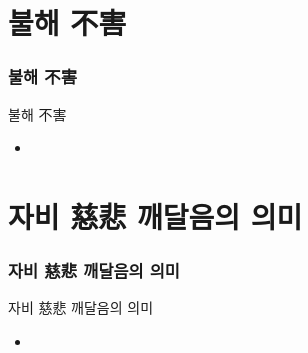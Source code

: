 \documentclass[aspectratio=1610,17pt,xcolor=pdftex,dvipsnames,table,handout]{beamer}
\begin{document}
		\section{				불해	不害	}
		\begin{frame} [t,plain]						
		\frametitle{			불해	不害	}
			\begin{block} { 		불해	不害	}
			\setlength{\leftmargini}{2em}			
			\begin{itemize}
				\item 
			\end{itemize}
			\end{block}						
								
		\end{frame}						

		\section{				자비 慈悲 깨달음의 의미		}
		\begin{frame} [t,plain]						
		\frametitle{			자비 慈悲 깨달음의 의미		}
			\begin{block} { 		자비 慈悲 깨달음의 의미		}
			\setlength{\leftmargini}{2em}			
			\begin{itemize}
				\item 
			\end{itemize}
			\end{block}						
								
		\end{frame}						




\end{document}
